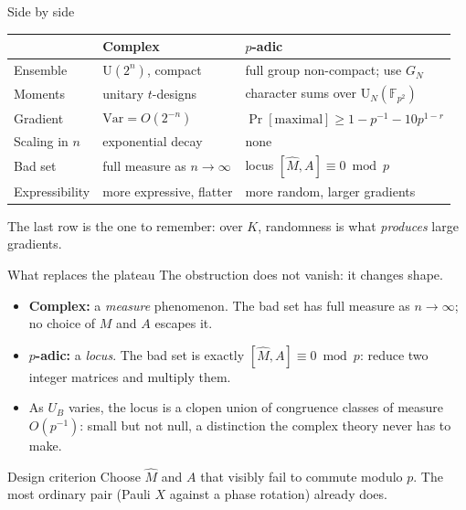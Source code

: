 \documentclass[aspectratio=169,compress]{beamer}
\newcommand{\FF}{\mathbb{F}}
\newcommand{\Uni}{\mathrm{U}}
\begin{document}
\begin{frame}{Side by side}
  \begin{center}
  \small
  \begin{tabular}{@{}lll@{}}
    \toprule
     & \textbf{Complex} & \textbf{$p$-adic} \\
    \midrule
    Ensemble        & $\Uni(2^{n})$, compact       & full group non-compact; use $G_N$ \\
    Moments         & unitary $t$-designs          & character sums over $\Uni_N(\FF_{p^2})$ \\
    Gradient        & $\mathrm{Var}=O(2^{-n})$     & $\Pr[\text{maximal}]\ge1-p^{-1}-10p^{1-r}$ \\
    Scaling in $n$  & exponential decay            & none \\
    Bad set         & full measure as $n\to\infty$ & locus $[\widehat M,A]\equiv0 \bmod p$ \\
    Expressibility  & more expressive, flatter     & more random, \alert{larger} gradients \\
    \bottomrule
  \end{tabular}
  \end{center}
  \vspace{0.6em}
  The last row is the one to remember: over $K$, randomness is what
  \emph{produces} large gradients.
\end{frame}

\begin{frame}{What replaces the plateau}
  The obstruction does not vanish: it changes shape.
  \begin{itemize}
    \item \textbf{Complex:} a \emph{measure} phenomenon. The bad set has full
      measure as $n\to\infty$; no choice of $M$ and $A$ escapes it.
    \item \textbf{$p$-adic:} a \emph{locus}. The bad set is exactly
      $[\widehat M,A]\equiv0\bmod p$: reduce two integer matrices and multiply
      them.
  \end{itemize}
  \begin{itemize}
    \item As $U_B$ varies, the locus is a clopen union of congruence classes of
      measure $O(p^{-1})$: small but \alert{not null}, a distinction the
      complex theory never has to make.
  \end{itemize}
  \begin{block}{Design criterion}
    Choose $\widehat M$ and $A$ that visibly fail to commute modulo $p$. The
    most ordinary pair (Pauli $X$ against a phase rotation) already does.
  \end{block}
\end{frame}
\end{document}
